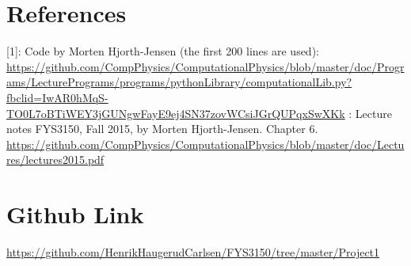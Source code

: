\documentclass[english,a4paper, 11pt]{article}
\begin{document}
\section{References}
 
[1]:
Code by Morten Hjorth-Jensen (the first 200 lines are used):
\newline
\url{https://github.com/CompPhysics/ComputationalPhysics/blob/master/doc/Programs/LecturePrograms/programs/pythonLibrary/computationalLib.py?fbclid=IwAR0hMqS-TO0L7oBTiWEY3jGUNgwFayE9ej4SN37zovWCsiJGrQUPqxSwXKk}
\newline
\newline
[2]: Lecture notes FYS3150, Fall 2015, by Morten Hjorth-Jensen. Chapter 6.
\newline
\url{https://github.com/CompPhysics/ComputationalPhysics/blob/master/doc/Lectures/lectures2015.pdf}

\section{Github Link}
\url{https://github.com/HenrikHaugerudCarlsen/FYS3150/tree/master/Project1}
\end{document}
